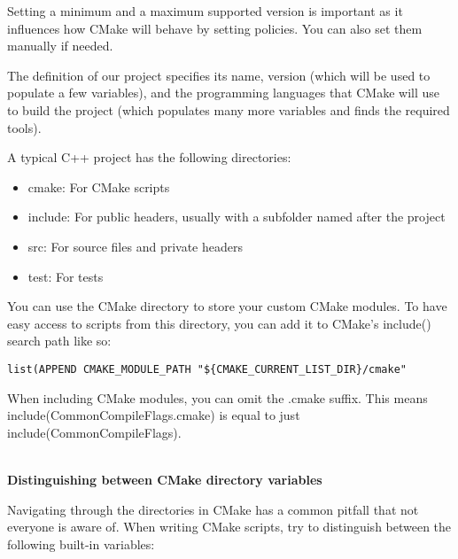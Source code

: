 Setting a minimum and a maximum supported version is important as it influences how CMake will behave by setting policies. You can also set them manually if needed.

The definition of our project specifies its name, version (which will be used to populate a few variables), and the programming languages that CMake will use to build the project (which populates many more variables and finds the required tools).

A typical C++ project has the following directories:

\begin{itemize}
\item 
cmake: For CMake scripts

\item 
include: For public headers, usually with a subfolder named after the project

\item 
src: For source files and private headers

\item 
test: For tests
\end{itemize}

You can use the CMake directory to store your custom CMake modules. To have easy access to scripts from this directory, you can add it to CMake's include() search path like so:

\begin{lstlisting}[style=styleCMake]
list(APPEND CMAKE_MODULE_PATH "${CMAKE_CURRENT_LIST_DIR}/cmake"
\end{lstlisting}

When including CMake modules, you can omit the .cmake suffix. This means include(CommonCompileFlags.cmake) is equal to just
include(CommonCompileFlags).

\hspace*{\fill} \\ %
\noindent
\textbf{Distinguishing between CMake directory variables}

Navigating through the directories in CMake has a common pitfall that not everyone is aware of. When writing CMake scripts, try to distinguish between the following built-in variables:

